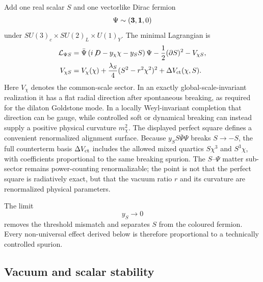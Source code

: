 \documentclass[11pt,a4paper]{article}
\newcommand{\Lag}{\mathcal{L}}
\begin{document}
Add one real scalar $S$ and one vectorlike Dirac fermion
\[
\Psi\sim({\bf3},{\bf1},0)
\]
under $SU(3)_c\times SU(2)_L\times U(1)_Y$. The minimal Lagrangian is
\begin{align}
\Lag_{\Psi S}={}&
\bar\Psi\left(i\!\not\!D-y_\chi\chi-y_SS\right)\Psi
-\frac12(\partial S)^2
-V_{\chi S},
\label{eq:psislag}\\
V_{\chi S}={}&
V_\chi(\chi)
+\frac{\lambda_S}{4}(S^2-r^2\chi^2)^2
+\Delta V_{\rm ct}(\chi,S).
\label{eq:alignpotential}
\end{align}
Here $V_\chi$ denotes the common-scale sector. In an exactly global-scale-invariant realization it has a flat radial direction after spontaneous breaking, as required for the dilaton Goldstone mode. In a locally Weyl-invariant completion that direction can be gauge, while controlled soft or dynamical breaking can instead supply a positive physical curvature $m_\chi^2$. The displayed perfect square defines a convenient renormalized alignment surface. Because $y_SS\bar\Psi\Psi$ breaks $S\to-S$, the full counterterm basis $\Delta V_{\rm ct}$ includes the allowed mixed quartics $S\chi^3$ and $S^3\chi$, with coefficients proportional to the same breaking spurion. The $S$--$\Psi$ matter sub-sector remains power-counting renormalizable; the point is not that the perfect square is radiatively exact, but that the vacuum ratio $r$ and its curvature are renormalized physical parameters.

The limit
\[
y_S\to0
\]
removes the threshold mismatch and separates $S$ from the coloured fermion. Every non-universal effect derived below is therefore proportional to a technically controlled spurion.

\subsection{Vacuum and scalar stability}
\end{document}
